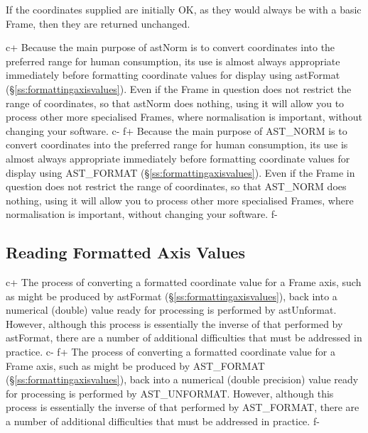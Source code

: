 \documentclass[twoside,11pt]{article}
\newcommand{\secref}[1]{\S\ref{#1}}
\newcommand{\secref}[1]{\ref{#1}}
\begin{document}
If the coordinates supplied are initially OK, as they would always be
with a basic Frame, then they are returned unchanged.

c+
Because the main purpose of astNorm is to convert coordinates into the
preferred range for human consumption, its use is almost always
appropriate immediately before formatting coordinate values for
display using astFormat (\secref{ss:formattingaxisvalues}). Even if
the Frame in question does not restrict the range of coordinates, so
that astNorm does nothing, using it will allow you to process other
more specialised Frames, where normalisation is important, without
changing your software.
c-
f+
Because the main purpose of AST\_NORM is to convert coordinates into
the preferred range for human consumption, its use is almost always
appropriate immediately before formatting coordinate values for
display using AST\_FORMAT (\secref{ss:formattingaxisvalues}). Even if
the Frame in question does not restrict the range of coordinates, so
that AST\_NORM does nothing, using it will allow you to process other
more specialised Frames, where normalisation is important, without
changing your software.
f-

\subsection{\label{ss:unformattingaxisvalues}Reading Formatted Axis Values}

c+
The process of converting a formatted coordinate value for a Frame
axis, such as might be produced by astFormat
(\secref{ss:formattingaxisvalues}), back into a numerical (double)
value ready for processing is performed by astUnformat.  However,
although this process is essentially the inverse of that performed by
astFormat, there are a number of additional difficulties that must be
addressed in practice.
c-
f+
The process of converting a formatted coordinate value for a Frame
axis, such as might be produced by AST\_FORMAT
(\secref{ss:formattingaxisvalues}), back into a numerical (double
precision) value ready for processing is performed by AST\_UNFORMAT.
However, although this process is essentially the inverse of that
performed by AST\_FORMAT, there are a number of additional difficulties
that must be addressed in practice.
f-
\end{document}
